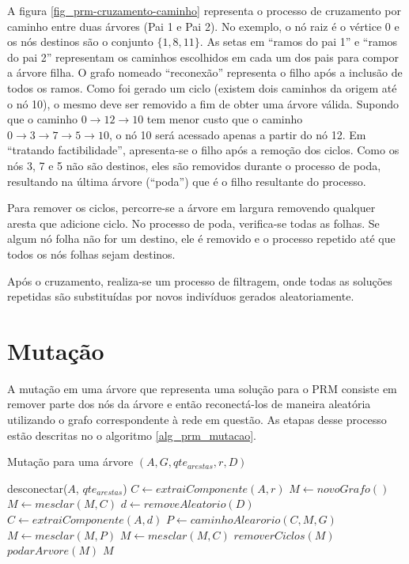 A figura \ref{fig_prm-cruzamento-caminho} representa o processo de cruzamento por caminho entre duas árvores (Pai 1 e Pai 2). No exemplo, o nó raiz é o vértice 0 e os nós destinos são o conjunto $\{1, 8, 11\}$. As setas em ``ramos do pai 1'' e ``ramos do pai 2'' representam os caminhos escolhidos em cada um dos pais para compor a árvore filha. O grafo nomeado ``reconexão'' representa o filho após a inclusão de todos os ramos. Como foi gerado um ciclo (existem dois caminhos da origem até o nó 10), o mesmo deve ser removido a fim de obter uma árvore válida. Supondo que o caminho $0 \rightarrow 12 \rightarrow 10$ tem menor custo que o caminho $0 \rightarrow 3 \rightarrow 7 \rightarrow 5 \rightarrow 10$, o nó 10 será acessado apenas a partir do nó 12. Em ``tratando factibilidade'', apresenta-se o filho após a remoção dos ciclos. Como os nós 3, 7 e 5 não são destinos, eles são removidos durante o processo de poda, resultando na última árvore (``poda'') que é o filho resultante do processo.

Para remover os ciclos, percorre-se a árvore em largura removendo qualquer aresta que adicione ciclo. No processo de poda, verifica-se todas as folhas. Se algum nó folha não for um destino, ele é removido e o processo repetido até que todos os nós folhas sejam destinos.

Após o cruzamento, realiza-se um processo de filtragem, onde todas as soluções repetidas são substituídas por novos indivíduos gerados aleatoriamente.

\section{Mutação}

A mutação em uma árvore que representa uma solução para o PRM consiste em remover parte dos nós da árvore e então reconectá-los de maneira aleatória utilizando o grafo correspondente à rede em questão. As etapas desse processo estão descritas no o algoritmo \ref{alg_prm_mutacao}.

\begin{algorithm}
	\caption{Mutação para uma árvore $(A, G, qte_{arestas}, r, D)$}
	\label{alg_prm_mutacao}
	\begin{algorithmic}[1]
		\State desconectar($A$, $qte_{arestas}$)
		\State $C \gets extraiComponente(A, r)$
		\State $M \gets novoGrafo()$
		\State $M \gets mesclar(M, C)$
		\State $d \gets removeAleatorio(D)$
		\State $C \gets extraiComponente(A, d)$
		\State $P \gets caminhoAlearorio(C, M, G)$
		\State $M \gets mesclar(M, P)$
		\EndIf
		\State $M \gets mesclar(M, C)$
		\EndWhile
		\State $removerCiclos(M)$
		\State $podarArvore(M)$
		\State \Return $M$
	\end{algorithmic}
\end{algorithm}

